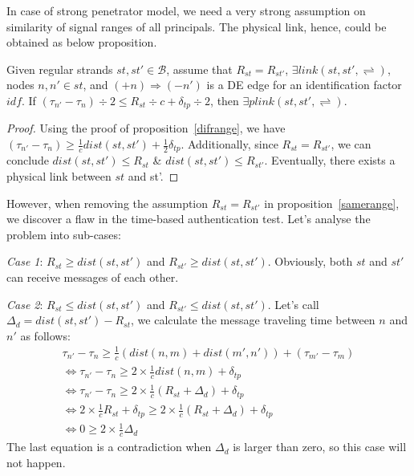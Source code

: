 In case of strong penetrator model, we need a very strong assumption on similarity of signal ranges of all principals. The physical link, hence, could be obtained as below proposition. 

\begin{Proposition}\label{samerange}
Given regular strands $st, st' \in \mathcal{B}$, assume that $R_{st} = R_{st'}$, $\exists link(st,st', \rightleftharpoons)$, nodes $n,n' \in st$, and $(+n) \Rightarrow (-n')$ is a DE edge for an identification factor $idf$. If $(\tau_{n'} - \tau_{n})\div 2 \le R_{st} \div c + \delta_{tp} \div 2$, then $\exists plink(st,st',\rightleftharpoons)$. 
\end{Proposition}
\begin{proof}

Using the proof of proposition~\ref{difrange}, we have $(\tau_{n'} - \tau_{n}) \ge \frac 1 {c} dist(st,st') + \frac 1 {2} \delta_{tp}$. Additionally, since $R_{st} = R_{st'}$, we can conclude $dist(st,st') \le R_{st}$ \&  $dist(st,st') \le R_{st'}$. Eventually, there exists a physical link between $st$ and st'. 


\end{proof}

However, when removing the assumption $R_{st} = R_{st'}$ in proposition~\ref{samerange}, we discover a flaw in the time-based authentication test. Let's analyse the problem into sub-cases:

\emph{Case 1}: $R_{st} \ge dist(st,st')$ and $R_{st'} \ge dist(st,st')$. Obviously, both $st$ and $st'$ can receive messages of each other. 

\emph{Case 2}: $R_{st} \le dist(st,st')$ and $R_{st'} \le dist(st,st')$. Let's call $\Delta_d = dist(st,st') - R_{st}$, we calculate the message traveling time between $n$ and $n'$ as follows: 
\begin{equation*}
\begin{split}
	 \tau_{n'} - \tau_{n} \ge \frac 1 {c}(dist(n,m) + dist(m', n')) + (\tau_{m'} - \tau_{m}) \\ \Leftrightarrow
	\tau_{n'} - \tau_{n} \ge 2 \times \frac 1 {c} dist(n,m) + \delta_{tp}  \\
\Leftrightarrow	\tau_{n'} - \tau_{n} \ge 2 \times \frac 1 {c}(R_{st} + \Delta_d) + \delta_{tp} \\
\Leftrightarrow	2 \times \frac 1 {c} R_{st} + \delta_{tp} \ge 2 \times \frac 1 {c} (R_{st} + \Delta_d) + \delta_{tp} \\
\Leftrightarrow	0 \ge 2 \times \frac 1 {c} \Delta_d 
\end{split}
\end{equation*}
The last equation is a contradiction when $\Delta_d$ is larger than zero, so this case will not happen. 

